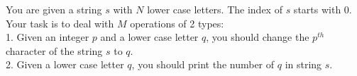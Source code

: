 You are given a string $s$ with $N$ lower case letters. The index of $s$ starts with 0.\\
Your task is to deal with $M$ operations of 2 types:\\
1. Given an integer $p$ and a lower case letter $q$, you should change the $p^{th}$ character of the string $s$ to $q$.\\
2. Given a lower case letter $q$, you should print the number of $q$ in string $s$.
